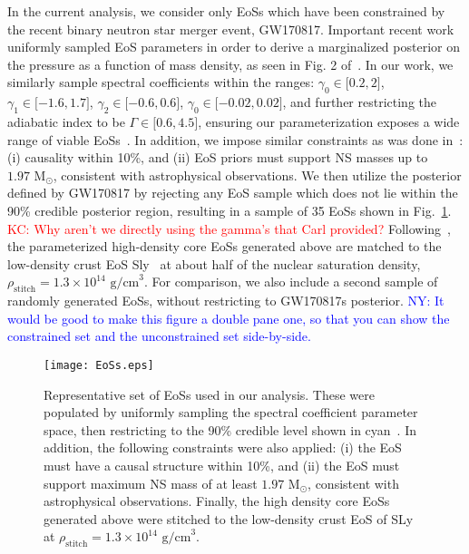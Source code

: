 \documentclass[prd,twocolumn,nofootinbib,superscriptaddress,amsmath,amssymb]{revtex4-1}
\newcommand{\ny}[1]{\textcolor{blue}{NY: #1} }
\newcommand{\kc}[1]{\textcolor{red}{KC: #1} }
\begin{document}
In the current analysis, we consider only EoSs which have been constrained by the recent binary neutron star merger event, GW170817.
Important recent work~\cite{LIGO:posterior} uniformly sampled EoS parameters in order to derive a marginalized posterior on the pressure as a function of mass density, as seen in Fig. 2 of~\cite{LIGO:posterior}.
In our work, we similarly sample spectral coefficients within the ranges: $\gamma_0 \in \lbrack 0.2,2 \rbrack$, $\gamma_1 \in \lbrack -1.6,1.7 \rbrack$, $\gamma_2 \in \lbrack -0.6,0.6 \rbrack$, $\gamma_0 \in \lbrack -0.02,0.02 \rbrack$, and further restricting the adiabatic index to be $\Gamma \in \lbrack 0.6,4.5 \rbrack$, ensuring our parameterization exposes a wide range of viable EoSs~\cite{Lindblom:parameters}.
In addition, we impose similar constraints as was done in~\cite{LIGO:posterior}: (i) causality within 10\%, and (ii) EoS priors must support NS masses up to $1.97 \text{ M}_{\odot}$, consistent with astrophysical observations.
We then utilize the posterior defined by GW170817 by rejecting any EoS sample which does not lie within the 90\% credible posterior region, resulting in a sample of 35 EoSs shown in Fig.~\ref{fig:eos}.
\kc{Why aren't we directly using the gamma's that Carl provided?}
Following~\cite{Read2009}, the parameterized high-density core EoSs generated above are matched to the low-density crust EoS Sly~\cite{Douchin:2001sv} at about half of the nuclear saturation density, $\rho_{\text{stitch}}=1.3 \times 10^{14} \text{ g/cm}^3$.
For comparison, we also include a second sample of randomly generated EoSs, without restricting to GW170817s posterior. {\ny{It would be good to make this figure a double pane one, so that you can show the constrained set and the unconstrained set side-by-side.}}
\begin{figure}
\begin{center} 
\texttt{[image: EoSs.eps]}
\end{center}
\caption{
Representative set of EoSs used in our analysis. 
These were populated by uniformly sampling the spectral coefficient parameter space, then restricting to the 90\% credible level shown in cyan~\cite{LIGO:posterior}.
In addition, the following constraints were also applied: (i) the EoS must have a causal structure within 10\%, and (ii) the EoS must support maximum NS mass of at least $1.97 \text{ M}_{\odot}$, consistent with astrophysical observations.
Finally, the high density core EoSs generated above were stitched to the low-density crust EoS of SLy~\cite{Douchin:2001sv} at $\rho_{\text{stitch}}=1.3 \times 10^{14} \text{ g/cm}^3$.
}
\label{fig:eos}
\end{figure} 
\end{document}
